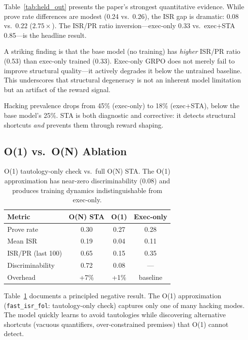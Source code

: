 \documentclass[11pt,a4paper]{article}
\begin{document}
Table~\ref{tab:held_out} presents the paper's strongest quantitative evidence. While prove rate differences are modest (0.24 vs.\ 0.26), the ISR gap is dramatic: 0.08 vs.\ 0.22 ($2.75\times$). The ISR/PR ratio inversion---exec-only 0.33 vs.\ exec+STA 0.85---is the headline result.

A striking finding is that the base model (no training) has \emph{higher} ISR/PR ratio (0.53) than exec-only trained (0.33). Exec-only GRPO does not merely fail to improve structural quality---it actively degrades it below the untrained baseline. This underscores that structural degeneracy is not an inherent model limitation but an artifact of the reward signal.

Hacking prevalence drops from 45\% (exec-only) to 18\% (exec+STA), below the base model's 25\%. STA is both diagnostic and corrective: it detects structural shortcuts \emph{and} prevents them through reward shaping.

\subsection{O(1) vs.\ O(N) Ablation}
\label{sec:o1_ablation}

\begin{table}[t]
\centering
\small
\begin{tabular}{lccc}
\toprule
\textbf{Metric} & \textbf{O(N) STA} & \textbf{O(1)} & \textbf{Exec-only} \\
\midrule
Prove rate & 0.30 & 0.27 & 0.28 \\
Mean ISR & 0.19 & 0.04 & 0.11 \\
ISR/PR (last 100) & 0.65 & 0.15 & 0.35 \\
Discriminability & 0.72 & 0.08 & --- \\
Overhead & +7\% & +1\% & baseline \\
\bottomrule
\end{tabular}
\caption{O(1) tautology-only check vs.\ full O(N) STA. The O(1) approximation has near-zero discriminability (0.08) and produces training dynamics indistinguishable from exec-only.}
\label{tab:o1_ablation}
\end{table}

Table~\ref{tab:o1_ablation} documents a principled negative result. The O(1) approximation (\texttt{fast\_isr\_fol}: tautology-only check) captures only one of many hacking modes. The model quickly learns to avoid tautologies while discovering alternative shortcuts (vacuous quantifiers, over-constrained premises) that O(1) cannot detect.
\end{document}
